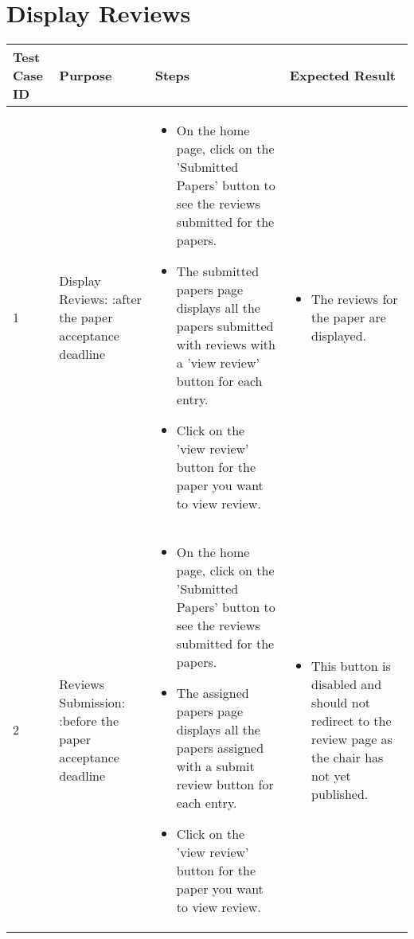 \documentclass[english,a4paper,12pt]{report}
\begin{document}
\section{Display Reviews }
\begin{longtable} { | p{2cm} | p{3cm}| p{6cm}| p{6cm} |} 
\hline 
\textbf{Test Case ID} & \textbf{Purpose}  & \textbf{Steps} &\textbf{Expected Result} \\
\hline 1 &  Display Reviews: :after the paper acceptance deadline &  
\vspace{-5mm}
\begin{itemize}
\item On the home page, click on the 'Submitted Papers' button to see the reviews submitted for the papers.
\item The submitted papers page displays all the papers submitted with reviews with a 'view review' button for each entry.
\item Click on the 'view review' button for the paper you want to view review.
\end{itemize}&
\vspace{-5mm}
\begin{itemize}
\item The reviews for the paper are displayed.
\end{itemize}\\
\hline 2 &  Reviews Submission: :before the paper acceptance deadline &  
\vspace{-5mm}
\begin{itemize}
\item On the home page, click on the 'Submitted Papers' button to see the reviews submitted for the papers.
\item The assigned papers page displays all the papers assigned with a submit review button for each entry.
\item Click on the 'view review' button for the paper you want to view review.
\end{itemize}&
\vspace{-5mm}
\begin{itemize}
\item This button is disabled and should not redirect to the review page as the chair has not yet published.
\end{itemize}\\

\hline
\end{longtable}
\end{document}

